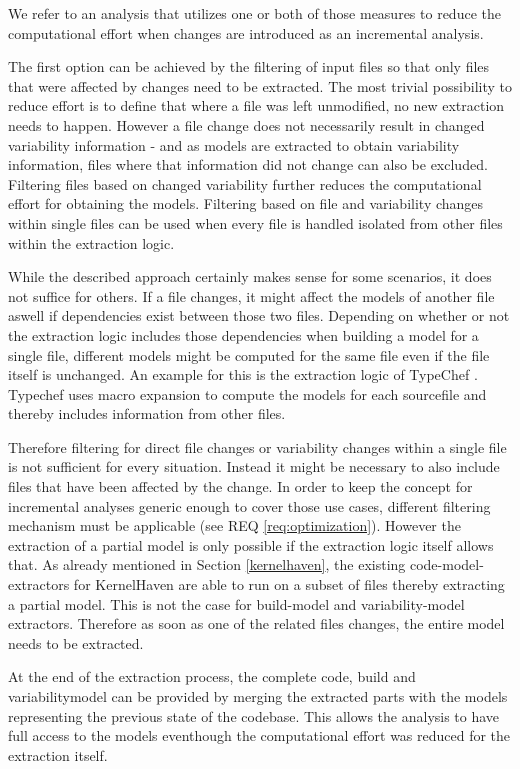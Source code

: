 \documentclass[a4paper]{article}
\begin{document}
We refer to an analysis that utilizes one or both of those measures to reduce the computational effort when changes are introduced as an incremental analysis.

The first option can be achieved by the filtering of input files so that only files that were affected by changes need to be extracted. The most trivial possibility to reduce effort is to define that where a file was left unmodified, no new extraction needs to happen. 
However a file change does not necessarily result in changed variability information - and as models are extracted to obtain variability information, files where that information did not change can also be excluded. Filtering files based on changed variability further reduces the computational effort for obtaining the models. Filtering based on file and variability changes within single files can be used when every file is handled isolated from other files within the extraction logic.

While the described approach certainly makes sense for some scenarios, it does not suffice for others. If a file changes, it might affect the models of another file aswell if dependencies exist between those two files. Depending on whether or not the extraction logic includes those dependencies when building a model for a single file, different models might be computed for the same file even if the file itself is unchanged. An example for this is the extraction logic of TypeChef \cite{Kenner:2010:TTT:1868688.1868693}. Typechef uses macro expansion to compute the models for each sourcefile and thereby includes information from other files. 

Therefore filtering for direct file changes or variability changes within a single file is not sufficient for every situation. Instead it might be necessary to also include files that have been affected by the change. In order to keep the concept for incremental analyses generic enough to cover those use cases, different filtering mechanism must be applicable (see REQ \ref{req:optimization}). However the extraction of a partial model is only possible if the extraction logic itself allows that. As already mentioned in Section \ref{kernelhaven}, the existing code-model-extractors for KernelHaven  are able to run on a subset of files thereby extracting a partial model.  This is not the case for build-model and variability-model extractors. Therefore as soon as one of the related files changes, the entire model needs to be extracted.  

At the end of the extraction process, the complete code, build and variabilitymodel can be provided by merging the extracted parts with the models representing the previous state of the codebase. This allows the analysis to have full access to the models eventhough the computational effort was reduced for the extraction itself.
\end{document}
